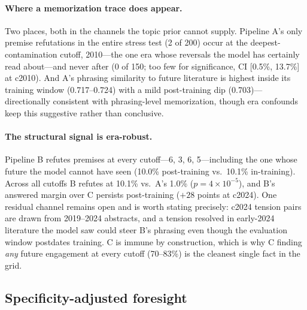 \paragraph{Where a memorization trace does appear.} Two places, both
in the channels the topic prior cannot supply. Pipeline A's only
premise refutations in the entire stress test (2 of 200) occur at the
deepest-contamination cutoff, 2010---the one era whose reversals the
model has certainly read about---and never after (0 of 150; too few
for significance, CI [0.5\%, 13.7\%] at c2010). And A's phrasing
similarity to future literature is highest inside its training window
(0.717--0.724) with a mild post-training dip (0.703)---directionally
consistent with phrasing-level memorization, though era confounds keep
this suggestive rather than conclusive.

\paragraph{The structural signal is era-robust.} Pipeline B refutes
premises at every cutoff---6, 3, 6, 5---including the one whose future
the model cannot have seen (10.0\% post-training vs.\ 10.1\%
in-training). Across all cutoffs B refutes at 10.1\% vs.\ A's 1.0\%
($p=4\times10^{-5}$), and B's answered margin over C persists
post-training ($+28$ points at c2024). One residual channel remains
open and is worth stating precisely: c2024 tension pairs are drawn from
2019--2024 abstracts, and a tension resolved in early-2024 literature
the model saw could steer B's phrasing even though the evaluation
window postdates training. C is immune by construction, which is why C
finding \emph{any} future engagement at every cutoff (70--83\%) is the
cleanest single fact in the grid.

\subsection{Specificity-adjusted foresight}
\label{sec:foresight:saf}

